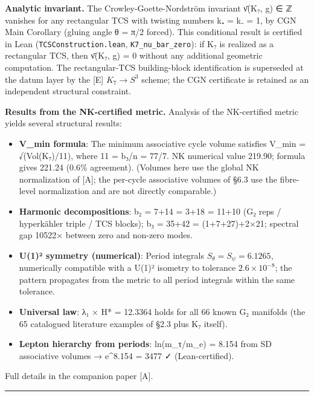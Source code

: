 \documentclass[11pt,a4paper]{article}
\begin{document}
\textbf{Analytic invariant.} The Crowley-Goette-Nordström invariant ν̄(K₇, g) ∈ ℤ \cite{16} vanishes for any rectangular TCS with twisting numbers k₊ = k₋ = 1, by CGN Main Corollary (gluing angle θ = π/2 forced). This conditional result is certified in Lean (\texttt{TCSConstruction.\allowbreak{}lean}, \texttt{K7\_\allowbreak{}nu\_\allowbreak{}bar\_\allowbreak{}zero}): if K₇ is realized as a rectangular TCS, then ν̄(K₇, g) = 0 without any additional geometric computation. The rectangular-TCS building-block identification is superseded at the datum layer by the {[}E{]} \(K_7 \to S^3\) scheme; the CGN certificate is retained as an independent structural constraint.

\textbf{Results from the NK-certified metric.} Analysis of the NK-certified metric yields several structural results:

\begin{itemize}
\tightlist
\item
  \textbf{V\_\allowbreak{}min formula}: The minimum associative cycle volume satisfies V\_\allowbreak{}min = √(Vol(K₇)/11), where 11 = b₃/n = 77/7. NK numerical value 219.90; formula gives 221.24 (0.6\% agreement). (Volumes here use the global NK normalization of {[}A{]}; the per-cycle associative volumes of §6.3 use the fibre-level normalization and are not directly comparable.)
\item
  \textbf{Harmonic decompositions}: b₂ = 7+14 = 3+18 = 11+10 (G₂ reps / hyperkähler triple / TCS blocks); b₃ = 35+42 = (1+7+27)+2×21; spectral gap 10522× between zero and non-zero modes.
\item
  \textbf{U(1)² symmetry (numerical)}: Period integrals \(S_\theta = S_\psi = 6.1265\), numerically compatible with a U(1)² isometry to tolerance \(2.6 \times 10^{-8}\); the pattern propagates from the metric to all period integrals within the same tolerance.
\item
  \textbf{Universal law}: λ₁ × H* = 12.3364 holds for all 66 known G₂ manifolds (the 65 catalogued literature examples of §2.3 plus K₇ itself).
\item
  \textbf{Lepton hierarchy from periods}: ln(m\_\allowbreak{}τ/m\_\allowbreak{}e) = 8.154 from SD associative volumes → e\^{}8.154 = 3477 ✓ (Lean-certified).
\end{itemize}

Full details in the companion paper {[}A{]}.

\begin{center}\rule{\linewidth}{0.5pt}\end{center}
\end{document}
